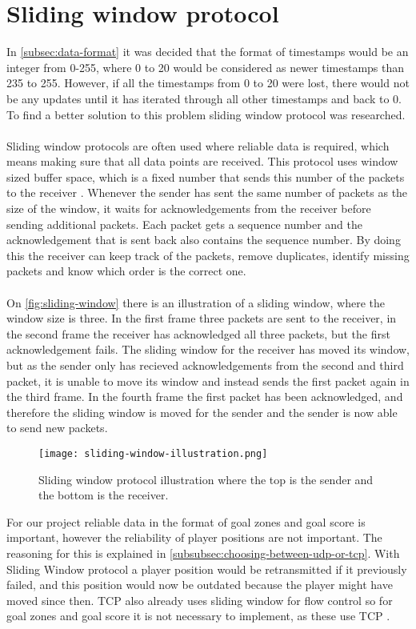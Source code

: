 \section{Sliding window protocol}
In \autoref{subsec:data-format} it was decided that the format of timestamps would be an integer from 0-255, where 0 to 20 would be considered as newer timestamps than 235 to 255.
However, if all the timestamps from 0 to 20 were lost, there would not be any updates until it has iterated through all other timestamps and back to 0.
To find a better solution to this problem sliding window protocol was researched.
\\\\
Sliding window protocols are often used where reliable data is required, which means making sure that all data points are received.
This protocol uses window sized buffer space, which is a fixed number that sends this number of the packets to the receiver \cite{design-and-validation-of-computer-protocols}.
Whenever the sender has sent the same number of packets as the size of the window, it waits for acknowledgements from the receiver before sending additional packets.
Each packet gets a sequence number and the acknowledgement that is sent back also contains the sequence number.
By doing this the receiver can keep track of the packets, remove duplicates, identify missing packets and know which order is the correct one.
\\\\
On \autoref{fig:sliding-window} there is an illustration of a sliding window, where the window size is three.
In the first frame three packets are sent to the receiver, in the second frame the receiver has acknowledged all three packets, but the first acknowledgement fails.
The sliding window for the receiver has moved its window, but as the sender only has recieved acknowledgements from the second and third packet, it is unable to move its window and instead sends the first packet again in the third frame.
In the fourth frame the first packet has been acknowledged, and therefore the sliding window is moved for the sender and the sender is now able to send new packets.
\begin{figure}[H]
    \centering
    \texttt{[image: sliding-window-illustration.png]}
    \caption{Sliding window protocol illustration where the top is the sender and the bottom is the receiver.}
    \label{fig:sliding-window}
\end{figure}
\noindent
For our project reliable data in the format of goal zones and goal score is important, however the reliability of player positions are not important.
The reasoning for this is explained in \autoref{subsubsec:choosing-between-udp-or-tcp}.
With Sliding Window protocol a player position would be retransmitted if it previously failed, and this position would now be outdated because the player might have moved since then.
TCP also already uses sliding window for flow control so for goal zones and goal score it is not necessary to implement, as these use TCP \cite{ibm:sliding-window}.
